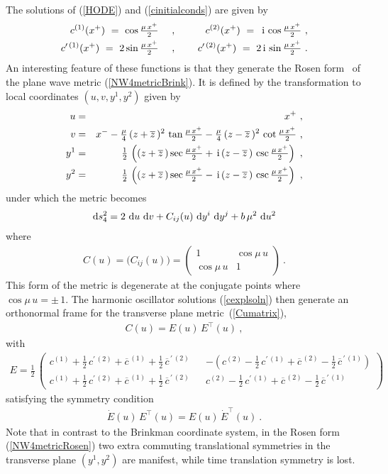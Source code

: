 \documentclass[11pt,a4paper]{article}
\newcommand{\ii}{{\rm i}}
\def\ii{{\,{\rm i}\,}}
\def\dd{{\rm d}}
\def\nn{\nonumber}
\def\bea{\begin{eqnarray}}
\def\eea{\end{eqnarray}}
\newcommand{\beq}{\begin{eqnarray}}
\newcommand{\eeq}{\end{eqnarray}}
\begin{document}
The solutions of (\ref{HODE}) and (\ref{cinitialconds}) are given by
\bea
c^{(1)}(x^+)~=~\cos\mbox{$\frac{\mu\,x^+}2$} ~~~~ &,& ~~~~
c^{(2)}(x^+)~=~\ii\cos\mbox{$\frac{\mu\,x^+}2$} \ , \nn\\
c^{\prime\,(1)}(x^+)~=~2\sin\mbox{$\frac{\mu\,x^+}2$} ~~~~ &,& ~~~~
c^{\prime\,(2)}(x^+)~=~2\ii\sin\mbox{$\frac{\mu\,x^+}2$} \ .
\label{cexplsoln}\eea
An interesting feature of these functions is that they generate the
Rosen form~\cite{Rosen1} of the plane wave metric
(\ref{NW4metricBrink}). It is defined by the transformation to local
coordinates $(u,v,y^1,y^2)$ given by
\bea
u&=&x^+ \ , \nn\\v&=&x^--\mbox{$\frac\mu4$}\,(z+\overline{z}\,)^2\,
\tan\mbox{$\frac{\mu\,x^+}2$}-\mbox{$\frac\mu4$}\,(z-\overline{z}\,)^2\,
\cot\mbox{$\frac{\mu\,x^+}2$} \ , \nn\\y^1&=&\mbox{$\frac12$}\,
\left((z+\overline{z}\,)\sec\mbox{$\frac{\mu\,x^+}2$}+\ii(z-\overline{z}\,)
\,\csc\mbox{$\frac{\mu\,x^+}2$}\right) \ , \nn\\y^2&=&\mbox{$\frac12$}\,
\left((z+\overline{z}\,)\sec\mbox{$\frac{\mu\,x^+}2$}-\ii(z-\overline{z}\,)
\,\csc\mbox{$\frac{\mu\,x^+}2$}\right) \ ,
\label{Rosen}\eeq
under which the metric becomes
\beq
\dd s_4^2=2~\dd u~\dd v+C_{ij}(u)~\dd y^i~\dd y^j+b\,\mu^2~\dd u^2
\label{NW4metricRosen}\eeq
where
\beq
C(u)=\bigl(C_{ij}(u)\bigr)=\begin{pmatrix}1&\cos\mu\,u\\\cos\mu\,
  u&1\end{pmatrix} \ .
\label{Cumatrix}\eeq
This form of the metric is degenerate at the conjugate points where
$\cos\mu\,u=\pm\,1$. The harmonic oscillator solutions
(\ref{cexplsoln}) then generate an orthonormal frame for the
transverse plane metric~(\ref{Cumatrix}),
\beq
C(u)=E(u)\,E^\top(u) \ ,
\label{CQrel}\eeq
with
\beq
E=\frac12\,\begin{pmatrix}c^{(1)}+\mbox{$\frac12$}\,c^{\prime\,(2)}+
\overline{c}^{\,(1)}+\mbox{$\frac12$}\,\overline{c}^{\,\prime
\,(2)}& &-\left(c^{(2)}-\mbox{$\frac12$}\,c^{\prime\,(1)}+
\overline{c}^{\,(2)}-\mbox{$\frac12$}\,\overline{c}^{\,\prime
\,(1)}\right)\\c^{(1)}+\mbox{$\frac12$}\,c^{\prime\,(2)}+
\overline{c}^{\,(1)}+\mbox{$\frac12$}\,\overline{c}^{\,\prime
\,(2)}& &c^{(2)}-\mbox{$\frac12$}\,c^{\prime\,(1)}+
\overline{c}^{\,(2)}-\mbox{$\frac12$}\,\overline{c}^{\,\prime
\,(1)}\end{pmatrix}
\label{Qvielbein}\eeq
satisfying the symmetry condition
\beq
\dot E(u)\,E^\top(u)=E(u)\,\dot E^\top(u) \ .
\label{Esymcond}\eeq
Note that in contrast to the Brinkman coordinate system, in the Rosen
form (\ref{NW4metricRosen}) two extra commuting translational
symmetries in the transverse plane $(y^1,y^2)$ are manifest, while
time translation symmetry is lost.
\end{document}
